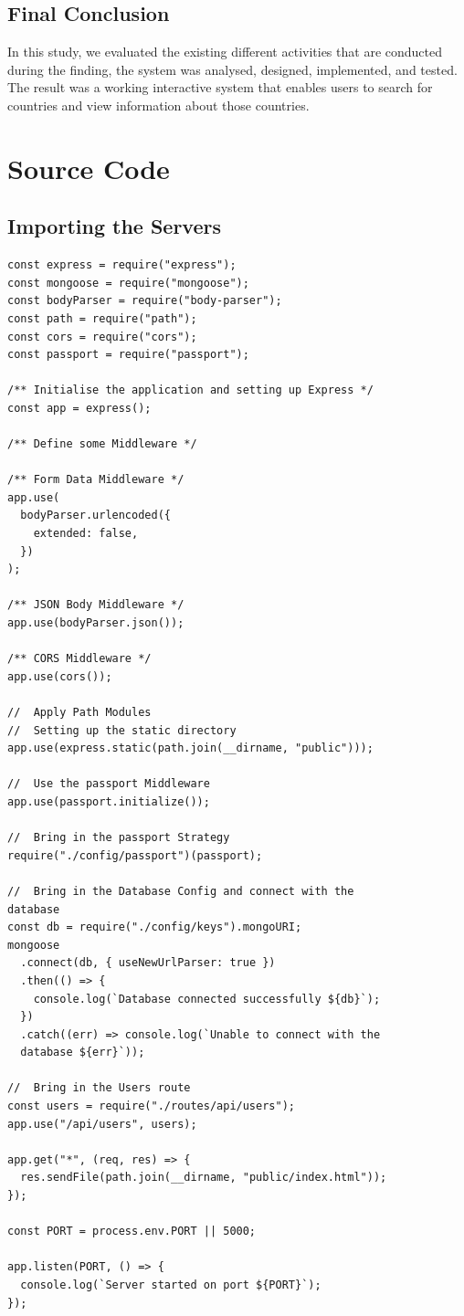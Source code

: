 \documentclass[twoside, a4paper, 12pt]{report}
\begin{document}
\section{Final Conclusion}
In this study, we evaluated the existing different activities that are conducted during the finding, the system was analysed, designed, implemented, and tested. The result was a working interactive system that enables users to search for countries and view information about those countries.

\appendix
\chapter{Source Code}

\section{Importing the Servers}
\begin{lstlisting}[frame=single]
const express = require("express");
const mongoose = require("mongoose");
const bodyParser = require("body-parser");
const path = require("path");
const cors = require("cors");
const passport = require("passport");

/** Initialise the application and setting up Express */
const app = express();

/** Define some Middleware */

/** Form Data Middleware */
app.use(
  bodyParser.urlencoded({
    extended: false,
  })
);

/** JSON Body Middleware */
app.use(bodyParser.json());

/** CORS Middleware */
app.use(cors());

//  Apply Path Modules
//  Setting up the static directory
app.use(express.static(path.join(__dirname, "public")));

//  Use the passport Middleware
app.use(passport.initialize());

//  Bring in the passport Strategy
require("./config/passport")(passport);

//  Bring in the Database Config and connect with the 
database
const db = require("./config/keys").mongoURI;
mongoose
  .connect(db, { useNewUrlParser: true })
  .then(() => {
    console.log(`Database connected successfully ${db}`);
  })
  .catch((err) => console.log(`Unable to connect with the 
  database ${err}`));

//  Bring in the Users route
const users = require("./routes/api/users");
app.use("/api/users", users);

app.get("*", (req, res) => {
  res.sendFile(path.join(__dirname, "public/index.html"));
});

const PORT = process.env.PORT || 5000;

app.listen(PORT, () => {
  console.log(`Server started on port ${PORT}`);
});

\end{lstlisting}
\end{document}
